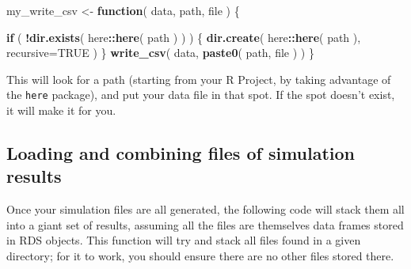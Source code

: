\documentclass[
]{book}
\newenvironment{Shaded}{\begin{snugshade}}{\end{snugshade}}
\newcommand{\AttributeTok}[1]{\textcolor[rgb]{0.13,0.29,0.53}{#1}}
\newcommand{\ConstantTok}[1]{\textcolor[rgb]{0.56,0.35,0.01}{#1}}
\newcommand{\ControlFlowTok}[1]{\textcolor[rgb]{0.13,0.29,0.53}{\textbf{#1}}}
\newcommand{\FunctionTok}[1]{\textcolor[rgb]{0.13,0.29,0.53}{\textbf{#1}}}
\newcommand{\NormalTok}[1]{#1}
\newcommand{\OtherTok}[1]{\textcolor[rgb]{0.56,0.35,0.01}{#1}}
\newcommand{\SpecialCharTok}[1]{\textcolor[rgb]{0.81,0.36,0.00}{\textbf{#1}}}
\newcommand{\StringTok}[1]{\textcolor[rgb]{0.31,0.60,0.02}{#1}}
\begin{document}
\begin{Shaded}
\begin{Highlighting}[]
\NormalTok{my\_write\_csv }\OtherTok{\textless{}{-}} \ControlFlowTok{function}\NormalTok{( data, path, file ) \{}
  
  \ControlFlowTok{if}\NormalTok{ ( }\SpecialCharTok{!}\FunctionTok{dir.exists}\NormalTok{( here}\SpecialCharTok{::}\FunctionTok{here}\NormalTok{( path ) ) ) \{}
    \FunctionTok{dir.create}\NormalTok{( here}\SpecialCharTok{::}\FunctionTok{here}\NormalTok{( path ), }\AttributeTok{recursive=}\ConstantTok{TRUE}\NormalTok{ ) }
\NormalTok{  \}}
  \FunctionTok{write\_csv}\NormalTok{( data, }\FunctionTok{paste0}\NormalTok{( path, file ) )}
\NormalTok{\}}
\end{Highlighting}
\end{Shaded}

This will look for a path (starting from your R Project, by taking advantage of the \texttt{here} package), and put your data file in that spot.
If the spot doesn't exist, it will make it for you.

\subsection{Loading and combining files of simulation results}\label{loading-and-combining-files-of-simulation-results}

Once your simulation files are all generated, the following code will stack them all into a giant set of results, assuming all the files are themselves data frames stored in RDS objects.
This function will try and stack all files found in a given directory; for it to work, you should ensure there are no other files stored there.

\begin{Shaded}
\end{Shaded}
\end{document}
